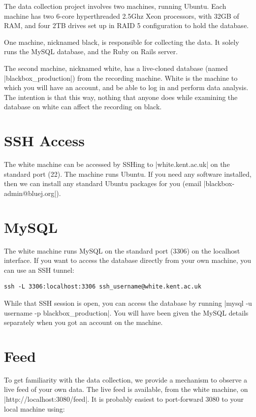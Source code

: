 \documentclass{report}
\begin{document}
The data collection project involves two machines, running Ubuntu.  Each
machine has two 6-core hyperthreaded 2.5Ghz Xeon processors, with 32GB of RAM,
and four 2TB drives set up in RAID 5 configuration to hold the database.

One machine, nicknamed black, is
responsible for collecting the data.  It solely runs the MySQL database, and
the Ruby on Rails server.  

The second machine, nicknamed white, has a live-cloned database (named |blackbox_production|) from the recording
machine.  White is the machine to which you will have an account, and be able
to log in and perform data analysis.  The intention is that this way, nothing
that anyone does while examining the database on white can affect the
recording on black.

\section{SSH Access}

The white machine can be accessed by SSHing to |white.kent.ac.uk| on the
standard port (22).  The machine runs Ubuntu.  If you need any software
installed, then we can install any standard Ubuntu packages for you (email
|blackbox-admin@bluej.org|).

\section{MySQL}

The white machine runs MySQL on the standard port (3306) on the localhost
interface.  If you want to access the database directly from your own machine,
you can use an SSH tunnel:

\begin{lstlisting}
ssh -L 3306:localhost:3306 ssh_username@white.kent.ac.uk
\end{lstlisting}

While that SSH session is open, you can access the database by running
|mysql -u username -p blackbox_production|.  You will have been given
the MySQL details separately when you got an account on the machine.

\section{Feed}

To get familiarity with the data collection, we provide a mechanism to observe
a live feed of your own data.  The live feed is available, from the
white machine, on |http://localhost:3080/feed|.  It is probably easiest to
port-forward 3080 to your local machine using:
\end{document}
